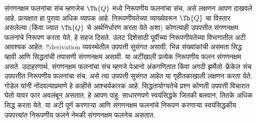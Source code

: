 \documentclass[../../../include/open-logic-section]{subfiles}
\begin{document}
\begin{explain}
संगणनक्षम फलनांचा संच म्हणजेच $\Th{Q}$ मध्ये निरूपणीय
फलनांचा संच, असे लक्षणन आपण दाखवले आहे. प्रत्यक्षात हा
पुरावा अधिक व्यापक आहे. निरूपणीयतेच्या व्याख्येवरून
$\Th{Q}$ चा विस्तार असलेल्या (किंवा ज्यात $\Th{Q}$ चे
अर्थनिर्धारण करता येते अशा) कोणत्याही उपपत्तीत
संगणनक्षम फलनांचे निरूपण करता येते, हे सहज दिसते.
उलट दिशेसाठी पूर्वीच्या निरूपणीयतेच्या विभागातील अटी
आवश्यक आहेत: !!{derivation} व्यवस्थेतील उपपत्ती सुसंगत
असावी, भिन्न संख्यांकांची असमता सिद्ध व्हावी आणि
सिद्धतांची तपासणी संगणनक्षम असावी. या अटींखाली
प्रत्येक निरूपणीय फलन संगणनक्षम असते. उदाहरणार्थ, संगणनक्षम फलनांचा संच
म्हणजे पेआनो अंकगणितात किंवा अगदी झर्मेलो--फ्रेंकेल संच
उपपत्तीत निरूपणीय फलनांचा संच, असे त्या उपपत्ती सुसंगत
आहेत या गृहीतकाखाली लक्षणन करता येते.
गोडेल यांनी नोंदवल्याप्रमाणे हे काहीसे आश्चर्यकारक आहे.
सिद्धतायोग्यतेचे प्रश्न कोणती उपपत्ती विचारात घेतो यावर
फार अवलंबून असतात, हे आपण पाहू: साधारणपणे स्वयंसिद्धके
जितकी बलवान, तितके अधिक सिद्ध करता येते. या अटी पूर्ण करणाऱ्या आणि संगणनक्षम फलनांचे निरूपण
करणाऱ्या स्वयंसिद्धकीय उपपत्त्यांत निरूपणीय फलने
नेमकी संगणनक्षम फलनेच असतात.
\end{explain}
\end{document}
